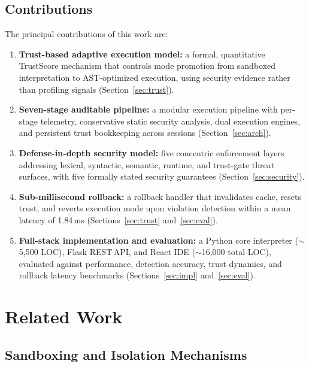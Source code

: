 \documentclass[conference]{IEEEtran}
\begin{document}
\subsection*{Contributions}
The principal contributions of this work are:
\begin{enumerate}
  \item \textbf{Trust-based adaptive execution model:} a formal,
    quantitative TrustScore mechanism that controls mode promotion
    from sandboxed interpretation to AST-optimized execution, using
    security evidence rather than profiling signals
    (Section~\ref{sec:trust}).
  \item \textbf{Seven-stage auditable pipeline:} a modular execution
    pipeline with per-stage telemetry, conservative static security
    analysis, dual execution engines, and persistent trust bookkeeping
    across sessions (Section~\ref{sec:arch}).
  \item \textbf{Defense-in-depth security model:} five concentric
    enforcement layers addressing lexical, syntactic, semantic,
    runtime, and trust-gate threat surfaces, with five formally
    stated security guarantees (Section~\ref{sec:security}).
  \item \textbf{Sub-millisecond rollback:} a rollback handler that
    invalidates cache, resets trust, and reverts execution mode upon
    violation detection within a mean latency of 1.84\,ms
    (Sections~\ref{sec:trust} and~\ref{sec:eval}).
  \item \textbf{Full-stack implementation and evaluation:} a Python
    core interpreter ($\sim$5,500 LOC), Flask REST\,API, and React
    IDE ($\sim$16,000 total LOC), evaluated against performance,
    detection accuracy, trust
    dynamics, and rollback latency benchmarks
    (Sections~\ref{sec:impl} and~\ref{sec:eval}).
\end{enumerate}

\section{Related Work}
\label{sec:related}

\subsection{Sandboxing and Isolation Mechanisms}
\end{document}
